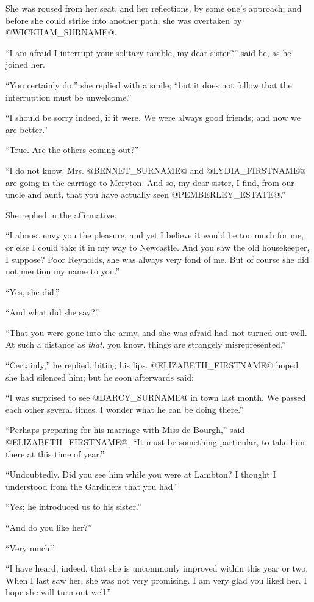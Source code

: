She was roused from her seat, and her reflections, by some one's
approach; and before she could strike into another path, she was
overtaken by @WICKHAM_SURNAME@.

``I am afraid I interrupt your solitary ramble, my dear sister?'' said he,
as he joined her.

``You certainly do,'' she replied with a smile; ``but it does not follow
that the interruption must be unwelcome.''

``I should be sorry indeed, if it were. We were always good friends; and
now we are better.''

``True. Are the others coming out?''

``I do not know. Mrs. @BENNET_SURNAME@ and @LYDIA_FIRSTNAME@ are going in the carriage to
Meryton. And so, my dear sister, I find, from our uncle and aunt, that
you have actually seen @PEMBERLEY_ESTATE@.''

She replied in the affirmative.

``I almost envy you the pleasure, and yet I believe it would be too much
for me, or else I could take it in my way to Newcastle. And you saw the
old housekeeper, I suppose? Poor Reynolds, she was always very fond of
me. But of course she did not mention my name to you.''

``Yes, she did.''

``And what did she say?''

``That you were gone into the army, and she was afraid had--not turned
out well. At such a distance as \textit{that}, you know, things are strangely
misrepresented.''

``Certainly,'' he replied, biting his lips. @ELIZABETH_FIRSTNAME@ hoped she had
silenced him; but he soon afterwards said:

``I was surprised to see @DARCY_SURNAME@ in town last month. We passed each other
several times. I wonder what he can be doing there.''

``Perhaps preparing for his marriage with Miss de Bourgh,'' said
@ELIZABETH_FIRSTNAME@. ``It must be something particular, to take him there at this
time of year.''

``Undoubtedly. Did you see him while you were at Lambton? I thought I
understood from the Gardiners that you had.''

``Yes; he introduced us to his sister.''

``And do you like her?''

``Very much.''

``I have heard, indeed, that she is uncommonly improved within this year
or two. When I last saw her, she was not very promising. I am very glad
you liked her. I hope she will turn out well.''

